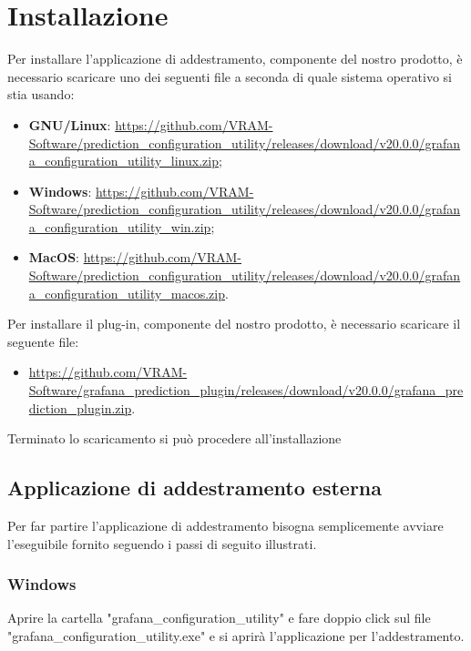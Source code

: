 \section{Installazione}
Per installare l'applicazione di addestramento, componente del nostro prodotto\glo, è necessario scaricare uno dei seguenti file a seconda di quale sistema operativo si stia usando:
\begin{itemize}
	\item \textbf{GNU/Linux}: \url{https://github.com/VRAM-Software/prediction_configuration_utility/releases/download/v20.0.0/grafana_configuration_utility_linux.zip};
	\item \textbf{Windows}: \url{https://github.com/VRAM-Software/prediction_configuration_utility/releases/download/v20.0.0/grafana_configuration_utility_win.zip};
	\item \textbf{MacOS}: \url{https://github.com/VRAM-Software/prediction_configuration_utility/releases/download/v20.0.0/grafana_configuration_utility_macos.zip}.
\end{itemize}
Per installare il plug-in, componente del nostro prodotto\glo, è necessario scaricare il seguente file:
\begin{itemize}
	\item \url{https://github.com/VRAM-Software/grafana_prediction_plugin/releases/download/v20.0.0/grafana_prediction_plugin.zip}.
\end{itemize}
Terminato lo scaricamento si può procedere all'installazione

\subsection{Applicazione di addestramento esterna}
Per far partire l'applicazione di addestramento bisogna semplicemente avviare l'eseguibile fornito seguendo i passi di seguito illustrati.
	\subsubsection{Windows}
	Aprire la cartella "grafana\_configuration\_utility" e fare doppio click sul file "grafana\_configuration\_utility.exe" e si aprirà l'applicazione per l'addestramento.

